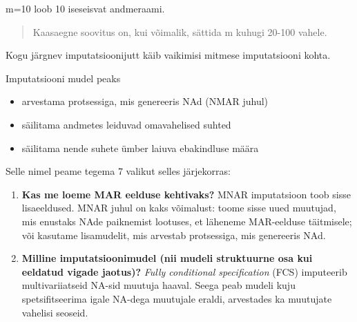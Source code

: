 \documentclass[]{book}
\newenvironment{Shaded}{\begin{snugshade}}{\end{snugshade}}
\newcommand{\CommentTok}[1]{\textcolor[rgb]{0.56,0.35,0.01}{\textit{#1}}}
\newcommand{\DataTypeTok}[1]{\textcolor[rgb]{0.13,0.29,0.53}{#1}}
\newcommand{\DecValTok}[1]{\textcolor[rgb]{0.00,0.00,0.81}{#1}}
\newcommand{\KeywordTok}[1]{\textcolor[rgb]{0.13,0.29,0.53}{\textbf{#1}}}
\newcommand{\NormalTok}[1]{#1}
\newcommand{\OperatorTok}[1]{\textcolor[rgb]{0.81,0.36,0.00}{\textbf{#1}}}
\newcommand{\OtherTok}[1]{\textcolor[rgb]{0.56,0.35,0.01}{#1}}
\newcommand{\StringTok}[1]{\textcolor[rgb]{0.31,0.60,0.02}{#1}}
\begin{document}
\begin{Shaded}
\end{Shaded}

m=10 loob 10 iseseisvat andmeraami.

\begin{quote}
Kaasaegne soovitus on, kui võimalik, sättida m kuhugi 20-100 vahele.
\end{quote}

Kogu järgnev imputatsioonijutt käib vaikimisi mitmese imputatsiooni kohta.

Imputatsiooni mudel peaks

\begin{itemize}
\item
  arvestama protsessiga, mis genereeris NAd (NMAR juhul)
\item
  säilitama andmetes leiduvad omavahelised suhted
\item
  säilitama nende suhete ümber laiuva ebakindluse määra
\end{itemize}

Selle nimel peame tegema 7 valikut selles järjekorras:

\begin{enumerate}
\def\labelenumi{\arabic{enumi}.}
\item
  \textbf{Kas me loeme MAR eelduse kehtivaks?} MNAR imputatsioon toob sisse lisaeeldused. MNAR juhul on kaks võimalust: toome sisse uued muutujad, mis enustaks NAde paiknemist lootuses, et läheneme MAR-eelduse täitmisele; või kasutame lisamudelit, mis arvestab protsessiga, mis genereeris NAd.
\item
  \textbf{Milline imputatsioonimudel (nii mudeli struktuurne osa kui eeldatud vigade jaotus)?} \emph{Fully conditional specification} (FCS) imputeerib multivariiatseid NA-sid muutuja haaval. Seega peab mudeli kuju spetsifitseerima igale NA-dega muutujale eraldi, arvestades ka muutujate vahelisi seoseid.
\end{enumerate}
\end{document}
